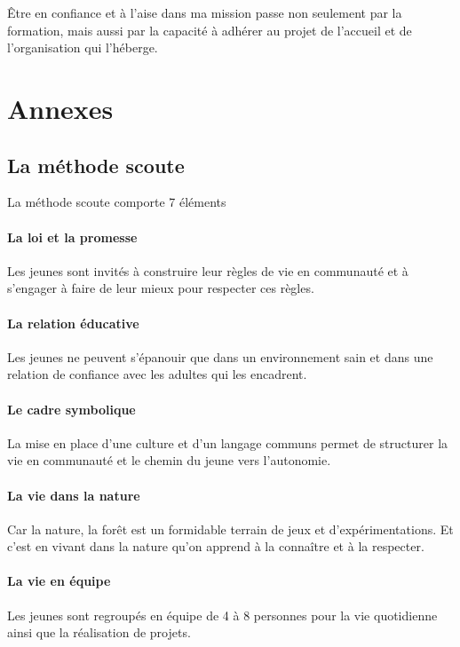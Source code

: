 \documentclass[titlepage,11pt,a4paper]{article}
\begin{document}
Être en confiance et à l'aise dans ma mission passe non seulement par la formation, mais
aussi par la capacité à adhérer au projet de l'accueil et de l'organisation qui l'héberge.

\newpage
\section{Annexes}

\subsection{\label{methsc}La méthode scoute}

La méthode scoute comporte 7 éléments

\paragraph{La loi et la promesse} Les jeunes sont invités à construire leur règles de vie
en communauté et à s'engager à faire de leur mieux pour respecter ces règles.

\paragraph{La relation éducative} Les jeunes ne peuvent s'épanouir que dans un
environnement sain et dans une relation de confiance avec les adultes qui les encadrent.

\paragraph{Le cadre symbolique} La mise en place d'une culture et d'un langage communs
permet de structurer la vie en communauté et le chemin du jeune vers l'autonomie.

\paragraph{La vie dans la nature} Car la nature, la forêt est un formidable terrain de jeux
et d'expérimentations. Et c'est en vivant dans la nature qu'on apprend à la connaître et à
la respecter.

\paragraph{La vie en équipe} Les jeunes sont regroupés en équipe de 4 à 8 personnes pour
la vie quotidienne ainsi que la réalisation de projets.
\end{document}

